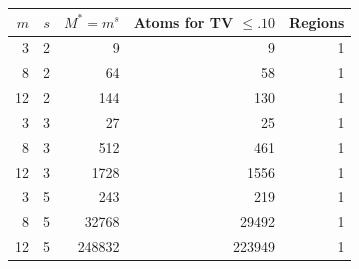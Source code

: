 \begin{tabular}{rrrrr}
\toprule
$m$ & $s$ & $M^*=m^s$ & Atoms for TV $\le .10$ & Regions \\
\midrule
3 & 2 & 9 & 9 & 1 \\
8 & 2 & 64 & 58 & 1 \\
12 & 2 & 144 & 130 & 1 \\
3 & 3 & 27 & 25 & 1 \\
8 & 3 & 512 & 461 & 1 \\
12 & 3 & 1728 & 1556 & 1 \\
3 & 5 & 243 & 219 & 1 \\
8 & 5 & 32768 & 29492 & 1 \\
12 & 5 & 248832 & 223949 & 1 \\
\bottomrule
\end{tabular}
